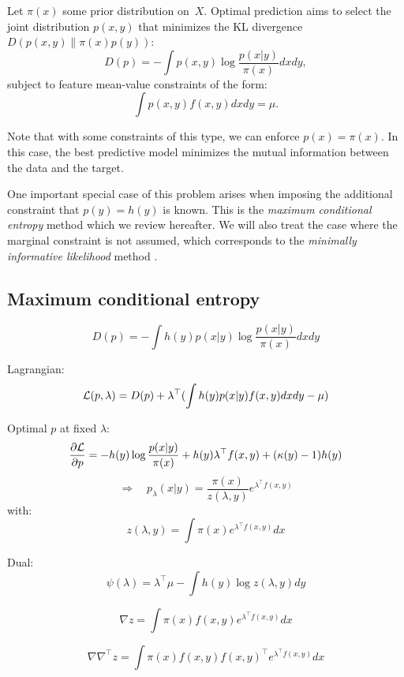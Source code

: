 \documentclass[english]{scrartcl}
\begin{document}
Let $\pi(x)$ some prior distribution on~$X$. Optimal prediction aims to select the joint distribution $p(x,y)$ that minimizes the KL divergence $D(p(x,y)\|\pi(x)p(y))$:
$$
D(p) = -\int p(x,y) \log \frac{p(x|y)}{\pi(x)} dx dy,
$$ subject to feature mean-value constraints of the form:
$$
\int p(x,y) f(x,y) dx dy = \mu.
$$

Note that with some constraints of this type, we can enforce $p(x)=\pi(x)$. In this case, the best predictive model minimizes the mutual information between the data and the target.

One important special case of this problem arises when imposing the additional constraint that $p(y)=h(y)$ is known. This is the {\em maximum conditional entropy} method \cite{BergerA-96} which we review hereafter. We will also treat the case where the marginal constraint is not assumed, which corresponds to the {\em minimally informative likelihood} method \cite{Yuan-99b,Yuan-99}.



\subsection{Maximum conditional entropy}

$$
D(p) = -\int h(y)p(x|y) \log \frac{p(x|y)}{\pi(x)} dxdy
$$

Lagrangian:
$$
{\cal L}(p,\lambda) = D(p) + \lambda^\top (\int h(y)p(x|y)f(x,y)dxdy - \mu)
$$

Optimal $p$ at fixed $\lambda$:
$$
\frac{\partial{\cal L}}{\partial p}
=
- h(y) \log \frac{p(x|y)}{\pi(x)} + h(y) \lambda^\top f(x,y) + (\kappa(y)-1)h(y)
$$
$$
\Rightarrow
\quad
p_{\lambda}(x|y) = \frac{\pi(x)}{z(\lambda,y)} e^{\lambda^\top f(x,y)}
$$
with:
$$
z(\lambda,y) = \int \pi(x) e^{\lambda^\top f(x,y)} dx
$$

Dual:
$$
\psi(\lambda) = \lambda^\top \mu - \int h(y) \log z(\lambda, y) dy 
$$

$$
\nabla z
=
\int \pi(x) f(x,y)  e^{\lambda^\top f(x,y)} dx
$$

$$
\nabla \nabla^\top z 
=
\int \pi(x) f(x,y) f(x,y)^\top e^{\lambda^\top f(x,y)} dx
$$
\end{document}

